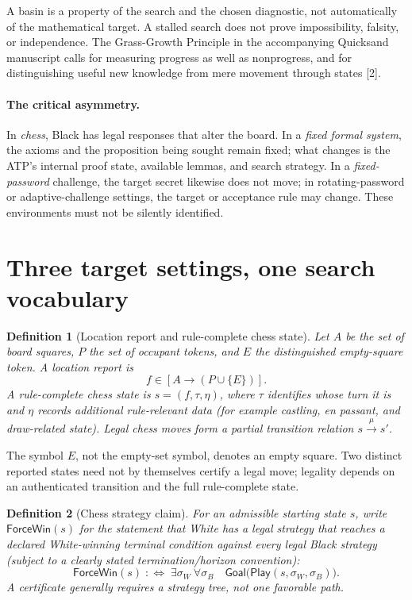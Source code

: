 \documentclass[11pt,letterpaper]{article}
\newtheorem{definition}{Definition}[section]
\begin{document}
A basin is a property of the search and the chosen diagnostic, not automatically of the mathematical target. A stalled search does not prove impossibility, falsity, or independence. The Grass-Growth Principle in the accompanying Quicksand manuscript calls for measuring progress as well as nonprogress, and for distinguishing useful new knowledge from mere movement through states [2].

\paragraph{The critical asymmetry.} In \emph{chess}, Black has legal responses that alter the board. In a \emph{fixed formal system}, the axioms and the proposition being sought remain fixed; what changes is the ATP's internal proof state, available lemmas, and search strategy. In a \emph{fixed-password} challenge, the target secret likewise does not move; in rotating-password or adaptive-challenge settings, the target or acceptance rule may change. These environments must not be silently identified.

\section{Three target settings, one search vocabulary}
\begin{definition}[Location report and rule-complete chess state]
Let $A$ be the set of board squares, $P$ the set of occupant tokens, and $E$ the distinguished \emph{empty-square token}. A location report is
\[
 f\in[A\to(P\cup\{E\})].
\]
A rule-complete chess state is $s=(f,\tau,\eta)$, where $\tau$ identifies whose turn it is and $\eta$ records additional rule-relevant data (for example castling, en passant, and draw-related state). Legal chess moves form a partial transition relation $s\xrightarrow{\mu}s'$.
\end{definition}
The symbol $E$, not the empty-set symbol, denotes an empty square. Two distinct reported states need not by themselves certify a legal move; legality depends on an authenticated transition and the full rule-complete state.

\begin{definition}[Chess strategy claim]
For an admissible starting state $s$, write $\mathsf{ForceWin}(s)$ for the statement that White has a legal strategy that reaches a declared White-winning terminal condition against \emph{every} legal Black strategy (subject to a clearly stated termination/horizon convention):
\[
\mathsf{ForceWin}(s)\;:\Longleftrightarrow\; \exists\sigma_W\ \forall\sigma_B\quad \mathsf{Goal}\bigl(\mathsf{Play}(s,\sigma_W,\sigma_B)\bigr).
\]
A certificate generally requires a strategy tree, not one favorable path.
\end{definition}
\end{document}
